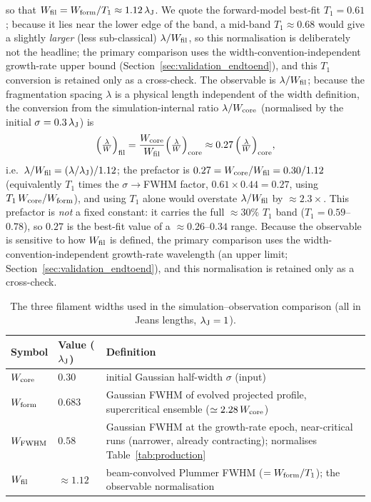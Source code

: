 \documentclass[usenatbib,twoside,twocolumn]{mnras}
\begin{document}
so that $W_{\rm fil}=W_{\rm form}/T_1\approx1.12\,\lambda_{\rm J}$. We quote the forward-model best-fit $T_1=0.61$; because it lies near the lower edge of the band, a mid-band $T_1\approx0.68$ would give a slightly \emph{larger} (less sub-classical) $\lambda/W_{\rm fil}$, so this normalisation is deliberately not the headline; the primary comparison uses the width-convention-independent growth-rate upper bound (Section~\ref{sec:validation_endtoend}), and this $T_1$ conversion is retained only as a cross-check. The observable is $\lambda/W_{\rm fil}$; because the fragmentation spacing $\lambda$ is a physical length independent of the width definition, the conversion from the simulation-internal ratio $\lambda/W_{\rm core}$ (normalised by the initial $\sigma=0.3\,\lambda_{\rm J}$) is
\begin{equation}
\Big(\tfrac{\lambda}{W}\Big)_{\rm fil} = \frac{W_{\rm core}}{W_{\rm fil}}\Big(\tfrac{\lambda}{W}\Big)_{\rm core} \approx 0.27\,\Big(\tfrac{\lambda}{W}\Big)_{\rm core},
\label{eq:t1_apply}
\end{equation}
i.e.\ $\lambda/W_{\rm fil}=(\lambda/\lambda_{\rm J})/1.12$; the prefactor is $0.27=W_{\rm core}/W_{\rm fil}=0.30/1.12$ (equivalently $T_1$ times the $\sigma\!\to\!$FWHM factor, $0.61\times0.44=0.27$, using $T_1\,W_{\rm core}/W_{\rm form}$), and using $T_1$ alone would overstate $\lambda/W_{\rm fil}$ by $\approx2.3\times$. This prefactor is \emph{not} a fixed constant: it carries the full $\approx30\%$ $T_1$ band ($T_1=0.59$--$0.78$), so $0.27$ is the best-fit value of a $\approx0.26$--$0.34$ range. Because the observable is sensitive to how $W_{\rm fil}$ is defined, the primary comparison uses the width-convention-independent growth-rate wavelength (an upper limit; Section~\ref{sec:validation_endtoend}), and this normalisation is retained only as a cross-check.

\begin{table}
\caption{The three filament widths used in the simulation--observation comparison (all in Jeans lengths, $\lambda_{\rm J}=1$).}
\label{tab:widthdefs}
\footnotesize
\setlength{\tabcolsep}{3pt}
\begin{tabular}{p{1.5cm}p{1.4cm}p{4.0cm}}
\toprule
Symbol & Value ($\lambda_{\rm J}$) & Definition \\
\midrule
$W_{\rm core}$ & $0.30$ & initial Gaussian half-width $\sigma$ (input) \\
$W_{\rm form}$ & $0.683$ & Gaussian FWHM of evolved projected profile, supercritical ensemble ($\simeq2.28\,W_{\rm core}$) \\
$W_{\rm FWHM}$ & $0.58$ & Gaussian FWHM at the growth-rate epoch, near-critical runs (narrower, already contracting); normalises Table~\ref{tab:production} \\
$W_{\rm fil}$ & $\approx1.12$ & beam-convolved Plummer FWHM ($=W_{\rm form}/T_1$); the observable normalisation \\
\bottomrule
\end{tabular}
\end{table}
\end{document}
